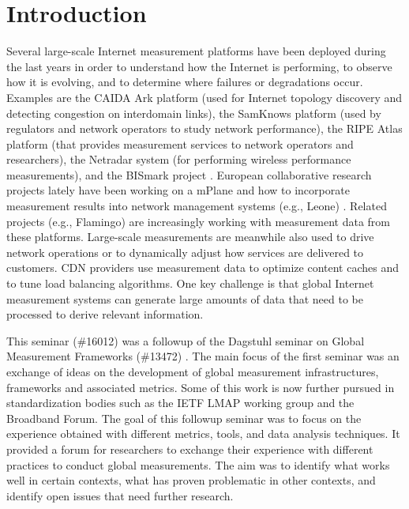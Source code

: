\section{Introduction}\label{sec:introduction}


Several large-scale Internet measurement platforms have been deployed during
the last years in order to understand how the Internet is performing, to
observe how it is evolving, and to determine where failures or degradations
occur. Examples are the CAIDA \ac{Ark} platform \cite{kclaffy:ccr:2016} (used
for Internet topology discovery and detecting congestion on interdomain
links), the SamKnows platform \cite{vbajpai:comst:2015} (used by regulators
and network operators to study network performance), the RIPE Atlas platform
\cite{ripencc:ipj:2015, vbajpai:ccr:2015} (that provides measurement services
to network operators and researchers), the Netradar system
\cite{ssonntag:wiopt:2013} (for performing wireless performance measurements),
and the BISmark project \cite{ssundaresan:usenix:2014}.  European
collaborative research projects lately have been working on a \ac{mPlane}
\cite{btrammell:commag:2014} and how to incorporate measurement results into
network management systems (e.g., Leone) \cite{leone}. Related projects (e.g.,
Flamingo) \cite{flamingo} are increasingly working with measurement data from
these platforms.  Large-scale measurements are meanwhile also used to drive
network operations or to dynamically adjust how services are delivered to
customers. \ac{CDN} providers use measurement data to optimize content caches
and to tune load balancing algorithms. One key challenge is that global
Internet measurement systems can generate large amounts of data that need to
be processed to derive relevant information.


This seminar (\#16012) was a followup of the Dagstuhl seminar on Global
Measurement Frameworks (\#13472) \cite{peardley:dagstuhl:2013}. The main focus
of the first seminar was an exchange of ideas on the development of global
measurement infrastructures, frameworks and associated metrics. Some of this
work is now further pursued in standardization bodies
\cite{vbajpai:comst:2015}  such as the IETF \ac{LMAP} working group and the
Broadband Forum.  The goal of this followup seminar was to focus on the
experience obtained with different metrics, tools, and data analysis
techniques. It provided a forum for researchers to exchange their experience
with different practices to conduct global measurements. The aim was to
identify what works well in certain contexts, what has proven problematic in
other contexts, and identify open issues that need further research.

